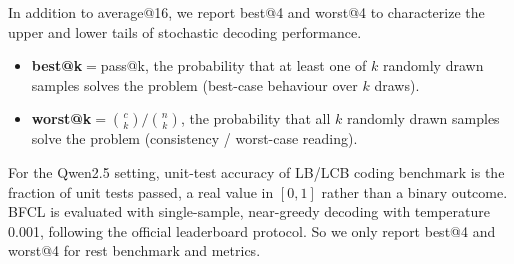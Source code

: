 \documentclass[11pt, a4paper]{utda}
\theoremstyle{plain}
\theoremstyle{definition}
\theoremstyle{remark}
\begin{document}
In addition to average@16, we report best@4 and worst@4 to characterize the
upper and lower tails of stochastic decoding performance. 

\begin{itemize}
    \item \textbf{best@k}$=$pass@k, the probability that at least one of $k$ randomly drawn samples solves the problem (best-case behaviour over $k$ draws).
    \item \textbf{worst@k}$=\binom{c}{k}\big/\binom{n}{k}$, the probability that all $k$ randomly drawn samples solve the problem (consistency / worst-case reading).
\end{itemize}

For the Qwen2.5 setting, unit-test accuracy of LB/LCB coding benchmark is the fraction of unit tests passed, a real value in $[0,1]$ rather than a binary outcome. BFCL is evaluated with single-sample, near-greedy decoding with temperature 0.001, following the official leaderboard protocol. So we only report best@4 and worst@4 for rest benchmark and metrics.
\end{document}
